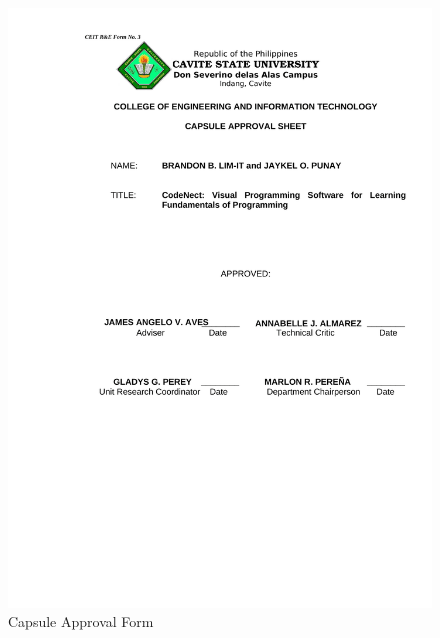\begin{figure}[H]
	 \centering
	 \includegraphics[width=\textwidth]{figures/3_capsule_approval.png}
	 \caption[]{Capsule Approval Form}
	 \label{fig:capsule_approval}
\end{figure}
\clearpage
\null\vfill
